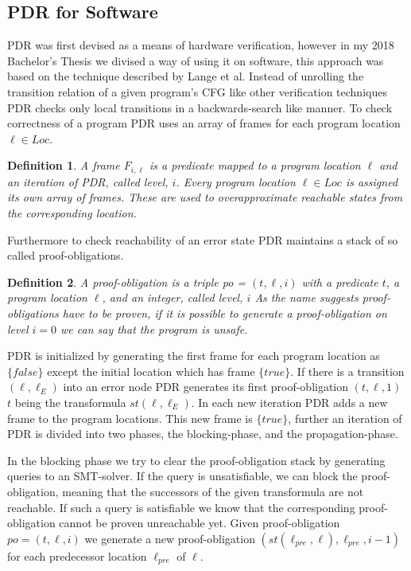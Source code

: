 \documentclass{article}
\newtheorem{mydef}{Definition}
\newcommand\mycom[1]{}
\newcommand\mycom[1]{#1}
\newcommand{\jw}[1]{\mycom{\todo[color=blue!40,inline]{\small JW: #1}}}
\begin{document}
	\subsection{PDR for Software}
	PDR was first devised as a means of hardware verification, however in my 2018 Bachelor's Thesis we divised a way of using it on software, this approach was based on the technique described by Lange et al. \jw{Citation needed}
	Instead of unrolling the transition relation of a given program's CFG like other verification techniques PDR checks only local transitions in a backwards-search like manner.
	\smallskip
	To check correctness of a program PDR uses an array of frames for each program location $\ell \in Loc$. 
	\begin{mydef}
		A frame $F_{i,\ell}$ is a predicate mapped to a program location $\ell$ and an iteration of PDR, called level, $i$.
		Every program location $\ell \in Loc$ is assigned its own array of frames. These are used to overapproximate reachable states from the corresponding location.
	\end{mydef}
	Furthermore to check reachability of an error state PDR maintains a stack of so called proof-obligations.
	\begin{mydef}
		A proof-obligation is a triple po = $(t, \ell, i)$ with a predicate $t$, a program location $\ell$, and an integer, called level, $i$
		As the name suggests proof-obligations have to be proven, if it is possible to generate a proof-obligation on level $i = 0$ we can say that the program is unsafe.
	\end{mydef}
	PDR is initialized by generating the first frame for each program location as $\{ false \}$ except the initial location which has frame $\{ true \}$. If there is a transition $(\ell, \ell_E)$ into an error node PDR generates its first proof-obligation $(t, \ell, 1)$ $t$ being the transformula $st(\ell, \ell_E)$.
	In each new iteration PDR adds a new frame to the program locations. This new frame is $\{true\}$, further
	an iteration of PDR is divided into two phases, the blocking-phase, and the propagation-phase.
	
	\bigskip
	
	In the blocking phase we try to clear the proof-obligation stack by generating queries to an SMT-solver.
	If the query is unsatisfiable, we can block the proof-obligation, meaning that the successors of the given transformula are not reachable.
	If such a query is satisfiable we know that the corresponding proof-obligation cannot be proven unreachable yet. Given proof-obligation  $po = (t, \ell, i)$ we generate a new proof-obligation $(st(\ell_{pre}, \ell), \ell_{pre}, i-1) $ for each predecessor location $\ell_{pre}$ of $\ell$.
	
\end{document}

